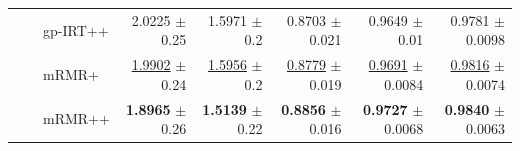 \begin{longtable}{llp{}rrrrr}
 &  & gp-IRT++ & 2.0225 {\scriptsize $\pm$ 0.25} & 1.5971 {\scriptsize $\pm$ 0.2} & 0.8703 {\scriptsize $\pm$ 0.021} & 0.9649 {\scriptsize $\pm$ 0.01} & 0.9781 {\scriptsize $\pm$ 0.0098} \\
 &  & mRMR+ & \underline{1.9902} {\scriptsize $\pm$ 0.24} & \underline{1.5956} {\scriptsize $\pm$ 0.2} & \underline{0.8779} {\scriptsize $\pm$ 0.019} & \underline{0.9691} {\scriptsize $\pm$ 0.0084} & \underline{0.9816} {\scriptsize $\pm$ 0.0074} \\
 &  & mRMR++ & \textbf{1.8965} {\scriptsize $\pm$ 0.26} & \textbf{1.5139} {\scriptsize $\pm$ 0.22} & \textbf{0.8856} {\scriptsize $\pm$ 0.016} & \textbf{0.9727} {\scriptsize $\pm$ 0.0068} & \textbf{0.9840} {\scriptsize $\pm$ 0.0063} \\
\end{longtable}